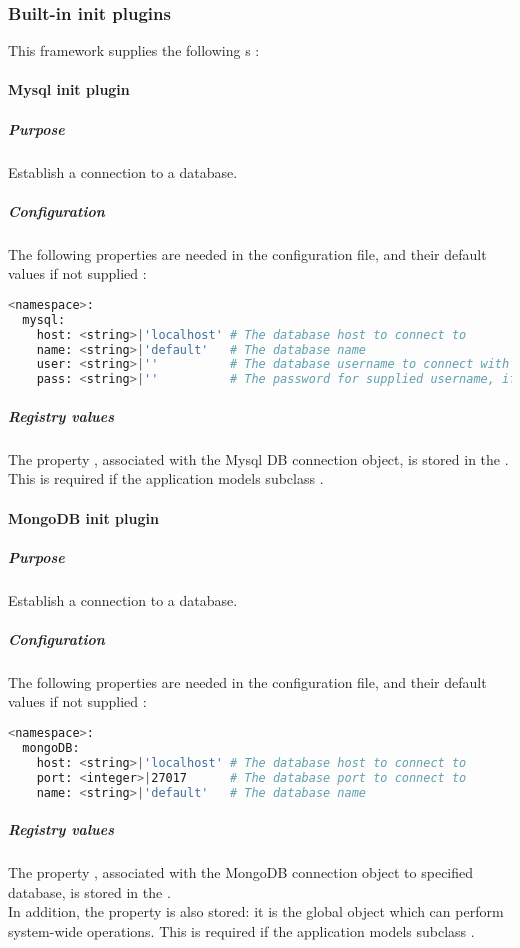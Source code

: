 \documentclass[pdftex,12pt,a4paper]{article}
\begin{document}
\subsubsection{Built-in init plugins} \label{sec:builtin-init-plugins}
This framework supplies the following s :

\paragraph{Mysql init plugin} \label{sec:mysql-init-plugin}
\subparagraph{Purpose}
Establish a connection to a  database.
\subparagraph{Configuration}
The following properties are needed in the configuration file, and their default values if not supplied :
\begin{lstlisting}[label="mysql-config",caption="Mysql config",language=bash]
<namespace>:
  mysql:
    host: <string>|'localhost' # The database host to connect to
    name: <string>|'default'   # The database name
    user: <string>|''          # The database username to connect with
    pass: <string>|''          # The password for supplied username, if any
\end{lstlisting}
\subparagraph{Registry values}
The  property , associated with the Mysql DB connection object, is stored in the .\\
This  is required if the application models subclass .

\paragraph{MongoDB init plugin} \label{sec:mongodb-init-plugin}
\subparagraph{Purpose}
Establish a connection to a  database.
\subparagraph{Configuration}
The following properties are needed in the configuration file, and their default values if not supplied :
\begin{lstlisting}[label="mongodb-config",caption="MongoDB config",language=bash]
<namespace>:
  mongoDB:
    host: <string>|'localhost' # The database host to connect to
    port: <integer>|27017      # The database port to connect to
    name: <string>|'default'   # The database name
\end{lstlisting}
\subparagraph{Registry values}
The  property , associated with the MongoDB connection object to specified database, is stored in the .\\
In addition, the  property  is also stored: it is the global  object which can perform system-wide operations.
This  is required if the application models subclass .
\end{document}

